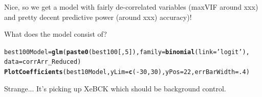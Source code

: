 \documentclass[a4paper]{article}\usepackage[]{graphicx}\usepackage[]{color}
\makeatletter
\newcommand{\hlnum}[1]{\textcolor[rgb]{0.686,0.059,0.569}{#1}}%
\newcommand{\hlstr}[1]{\textcolor[rgb]{0.192,0.494,0.8}{#1}}%
\newcommand{\hlopt}[1]{\textcolor[rgb]{0,0,0}{#1}}%
\newcommand{\hlstd}[1]{\textcolor[rgb]{0.345,0.345,0.345}{#1}}%
\newcommand{\hlkwb}[1]{\textcolor[rgb]{0.69,0.353,0.396}{#1}}%
\newcommand{\hlkwc}[1]{\textcolor[rgb]{0.333,0.667,0.333}{#1}}%
\newcommand{\hlkwd}[1]{\textcolor[rgb]{0.737,0.353,0.396}{\textbf{#1}}}%
\newenvironment{kframe}{%
 \def\at@end@of@kframe{}%
 \ifinner\ifhmode%
  \def\at@end@of@kframe{\end{minipage}}%
  \begin{minipage}{\columnwidth}%
 \fi\fi%
 \def\FrameCommand##1{\hskip\@totalleftmargin \hskip-\fboxsep
 \colorbox{shadecolor}{##1}\hskip-\fboxsep
     \hskip-\linewidth \hskip-\@totalleftmargin \hskip\columnwidth}%
 \MakeFramed {\advance\hsize-\width
   \@totalleftmargin\z@ \linewidth\hsize
   \@setminipage}}%
 {\par\unskip\endMakeFramed%
 \at@end@of@kframe}
\newenvironment{knitrout}{}{} %
\makeatother
\begin{document}
Nice, so we get a model with fairly de-correlated variables (maxVIF around xxx) and pretty decent predictive power (around xxx) accuracy)!

What does the model consist of?

\begin{knitrout}
\color{fgcolor}\begin{kframe}
\begin{alltt}
\hlstd{best100Model} \hlkwb{=} \hlkwd{glm}\hlstd{(}\hlkwd{paste0}\hlstd{(best100[,}\hlnum{5}\hlstd{]),}\hlkwc{family}\hlstd{=}\hlkwd{binomial}\hlstd{(}\hlkwc{link}\hlstd{=}\hlstr{'logit'}\hlstd{),}
                           \hlkwc{data}\hlstd{=corrArr_Reduced)}
\hlkwd{PlotCoefficients}\hlstd{(best10Model,}\hlkwc{yLim}\hlstd{=}\hlkwd{c}\hlstd{(}\hlopt{-}\hlnum{30}\hlstd{,}\hlnum{30}\hlstd{),}\hlkwc{yPos}\hlstd{=}\hlnum{22}\hlstd{,}\hlkwc{errBarWidth}\hlstd{=}\hlnum{.4}\hlstd{)}
\end{alltt}


{\ttfamily\noindent\bfseries\color{errorcolor}{\#\# Error in PlotCoefficients(best10Model, yLim = c(-30, 30), yPos = 22, errBarWidth = 0.4): object 'best10Model' not found}}\end{kframe}
\end{knitrout}

Strange... It's picking up XeBCK which should be background control. 

\end{document}
